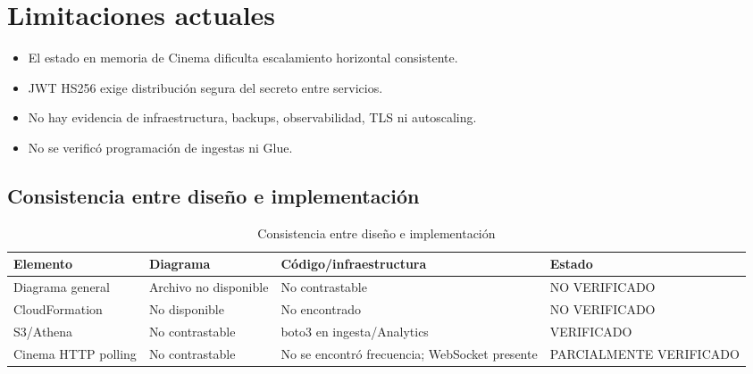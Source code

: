 \chapter{Limitaciones actuales}\begin{itemize}\item El estado en memoria de Cinema dificulta escalamiento horizontal consistente.\item JWT HS256 exige distribución segura del secreto entre servicios.\item No hay evidencia de infraestructura, backups, observabilidad, TLS ni autoscaling.\item No se verificó programación de ingestas ni Glue.\end{itemize}\section{Consistencia entre diseño e implementación}\begin{table}[H]\centering\caption{Consistencia entre diseño e implementación}\begin{tabularx}{\textwidth}{lXXX}\toprule Elemento&Diagrama&Código/infraestructura&Estado\\\midrule Diagrama general&Archivo no disponible&No contrastable&NO VERIFICADO\\CloudFormation&No disponible&No encontrado&NO VERIFICADO\\S3/Athena&No contrastable&boto3 en ingesta/Analytics&VERIFICADO\\Cinema HTTP polling&No contrastable&No se encontró frecuencia; WebSocket presente&PARCIALMENTE VERIFICADO\\\bottomrule\end{tabularx}\end{table}
